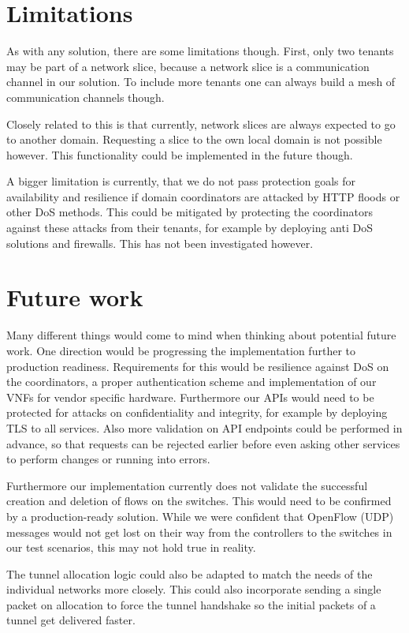 \section{Limitations}
As with any solution, there are some limitations though. First, only two tenants may be part of a network slice, because a network slice is a communication channel in our solution. To include more tenants one can always build a mesh of communication channels though.

Closely related to this is that currently, network slices are always expected to go to another domain. Requesting a slice to the own local domain is not possible however. This functionality could be implemented in the future though.

A bigger limitation is currently, that we do not pass protection goals for availability and resilience if domain coordinators are attacked by HTTP floods or other DoS methods. This could be mitigated by protecting the coordinators against these attacks from their tenants, for example by deploying anti DoS solutions and firewalls. This has not been investigated however.

\section{Future work}
Many different things would come to mind when thinking about potential future work. One direction would be progressing the implementation further to production readiness. Requirements for this would be resilience against DoS on the coordinators, a proper authentication scheme and implementation of our VNFs for vendor specific hardware. Furthermore our APIs would need to be protected for attacks on confidentiality and integrity, for example by deploying TLS to all services. Also more validation on API endpoints could be performed in advance, so that requests can be rejected earlier before even asking other services to perform changes or running into errors.

Furthermore our implementation currently does not validate the successful creation and deletion of flows on the switches. This would need to be confirmed by a production-ready solution. While we were confident that OpenFlow (UDP) messages would not get lost on their way from the controllers to the switches in our test scenarios, this may not hold true in reality.

The tunnel allocation logic could also be adapted to match the needs of the individual networks more closely. This could also incorporate sending a single packet on allocation to force the tunnel handshake so the initial packets of a tunnel get delivered faster.

